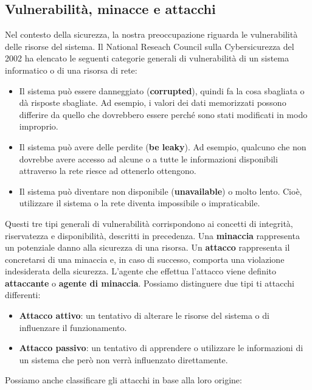 \subsection{Vulnerabilità, minacce e attacchi}
Nel contesto della sicurezza, la nostra preoccupazione riguarda le vulnerabilità
delle risorse del sistema. Il National Reseach Council sulla Cybersicurezza del 2002
ha elencato le seguenti categorie generali di
vulnerabilità di un sistema informatico o di una risorsa di rete:

\begin{itemize}
    \item Il sistema può essere danneggiato (\textbf{corrupted}), quindi fa la cosa sbagliata o dà risposte sbagliate. Ad esempio, i valori dei dati memorizzati possono differire da quello che dovrebbero essere perché sono stati modificati in modo improprio.
    \item Il sistema può avere delle perdite (\textbf{be leaky}). Ad esempio,
          qualcuno che non dovrebbe avere accesso ad alcune o a tutte le informazioni
          disponibili attraverso la rete riesce ad ottenerlo ottengono.
    \item Il sistema può diventare non disponibile (\textbf{unavailable}) o molto
          lento. Cioè, utilizzare il sistema o la rete diventa impossibile o impraticabile.
\end{itemize}

Questi tre tipi generali di vulnerabilità corrispondono ai concetti di integrità,
riservatezza e disponibilità, descritti in precedenza.
Una \textbf{minaccia} rappresenta un potenziale danno alla sicurezza di una risorsa.
Un \textbf{attacco} rappresenta il concretarsi di  una minaccia e, in caso di
successo, comporta una violazione indesiderata della sicurezza.
L'agente che effettua l'attacco viene definito \textbf{attaccante} o
\textbf{agente di minaccia}. Possiamo distinguere due tipi ti attacchi differenti:

\begin{itemize}
    \item \textbf{Attacco attivo}: un tentativo di alterare le risorse del
          sistema o di influenzare il funzionamento.
    \item \textbf{Attacco passivo}: un tentativo di apprendere o
          utilizzare le informazioni di un sistema che però non verrà influenzato
          direttamente.
\end{itemize}

Possiamo anche classificare gli attacchi in base alla loro origine:

